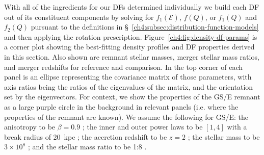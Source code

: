 With all of the ingredients for our DFs determined individually we build each DF out of its constituent components by solving for $f_{1}(\mathcal{E})$, $f(Q)$, or $f_{1}(Q)$ and $f_{2}(Q)$ pursuant to the definitions in \S~\ref{ch4:subsec:distribution-function-models} and then applying the rotation prescription. Figure~\ref{ch4:fig:density-df-params} is a corner plot showing the best-fitting density profiles and DF properties derived in this section. Also shown are remnant stellar masses, merger stellar mass ratios, and merger redshifts for reference and comparison. In the top corner of each panel is an ellipse representing the covariance matrix of those parameters, with axis ratios being the ratios of the eigenvalues of the matrix, and the orientation set by the eigenvectors. For context, we show the properties of the GS/E remnant as a large purple circle in the background in relevant panels (i.e. where the properties of the remnant are known). We assume the following for GS/E: the anisotropy to be $\beta=0.9$ \parencite{belokurov18,lancaster19}; the inner and outer power laws to be $[1,4]$ with a break radius of 20~kpc \parencite[][]{han22,lane23}; the accretion redshift to be $z=2$ \parencite[see][]{mackereth19a,montalban21}; the stellar mass to be $3\times10^{8}$ \parencite[a value typical of recent findings;][]{mackereth20,han22,lane23}; and the stellar mass ratio to be 1:8 \parencite{lane23}. 

